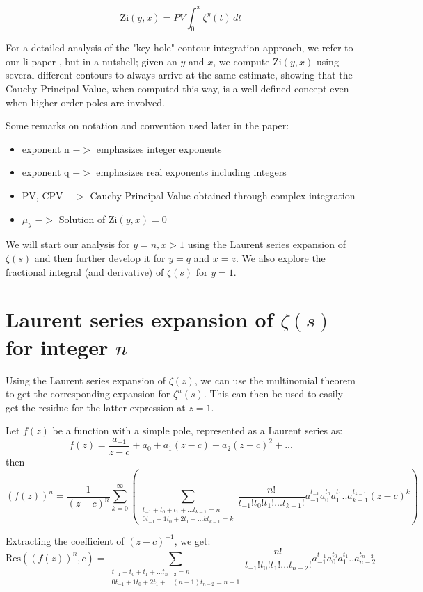 \documentclass[a4paper,11pt,twoside]{amsart}
\newcommand\li{\mathrm{li}}
\newcommand\Zi{\mathrm{Zi}}
\newcommand\Res{\mathrm{Res}}
\begin{document}
\begin{equation}\label{zi1}
 \Zi(y,x) = PV \int_0^x {\zeta^{y}(t)} \,dt
\end{equation}


For a detailed analysis of the "key hole" contour integration approach, we refer to our $\li$-paper \cite{mudw}, but in a nutshell; given an $y$ and $x$, we compute $\Zi(y,x)$ using several different contours to always arrive at the same estimate, showing that the Cauchy Principal Value, when computed this way, is a well defined concept even when higher order poles are involved. 
  
Some remarks on notation and convention used later in the paper:
\begin{itemize}
 \item exponent n $->$ emphasizes integer exponents
 \item exponent q $->$ emphasizes real exponents including integers
 \item PV, CPV $->$ Cauchy Principal Value obtained through complex integration 
 \item $\mu_y$ $->$ Solution of $\Zi(y,x)=0$
\end{itemize}

We will start our analysis for $y = n, x > 1$ using the Laurent series expansion of $\zeta(s)$ and then further develop it for $y = q$ and $x = z$. We also explore the fractional integral (and derivative) of $\zeta(s)$ for $y=1$.

\section{Laurent series expansion of $\zeta(s)$ for integer $n$}

Using the Laurent series expansion of $\zeta(z)$, we can use the multinomial theorem to get the corresponding expansion for $\zeta^{n}(s)$. This can then be used to easily get the residue for the latter expression at $z=1$.

Let $f(z)$ be a function with a simple pole, represented as a Laurent series as: $$f(z) = \frac{a_{-1}}{z-c} + a_0 + a_1 (z-c) + a_2 (z-c)^2 + ...$$
then $$(f(z))^n = \frac{1}{(z-c)^n} \sum\limits_{k=0}^{\infty}(\sum\limits_{\substack{t_{-1} + t_0 + t_1 + ... t_{k-1} = n \\ 0t_{-1} + 1t_0 + 2t_1 + ... kt_{k-1} = k}} \frac{n!}{t_{-1}!t_{0}!t_{1}!...t_{k-1}!} a_{-1}^{t_{-1}} a_{0}^{t_0}a_{1}^{t_1}..a_{k-1}^{t_{k-1}} (z-c)^k)$$

Extracting the coefficient of $(z-c)^{-1}$, we get:
$$\Res((f(z))^n,c) =  
\sum\limits_{\substack{t_{-1} + t_0 + t_1 + ... t_{n-2} = n \\ 0t_{-1} + 1t_0 + 2t_1 + ... (n-1)t_{n-2} = n-1}} \frac{n!}{t_{-1}!t_{0}!t_{1}!...t_{n-2}!} a_{-1}^{t_{-1}} a_{0}^{t_0}a_{1}^{t_1}..a_{n-2}^{t_{n-2}}$$
 
\end{document}

